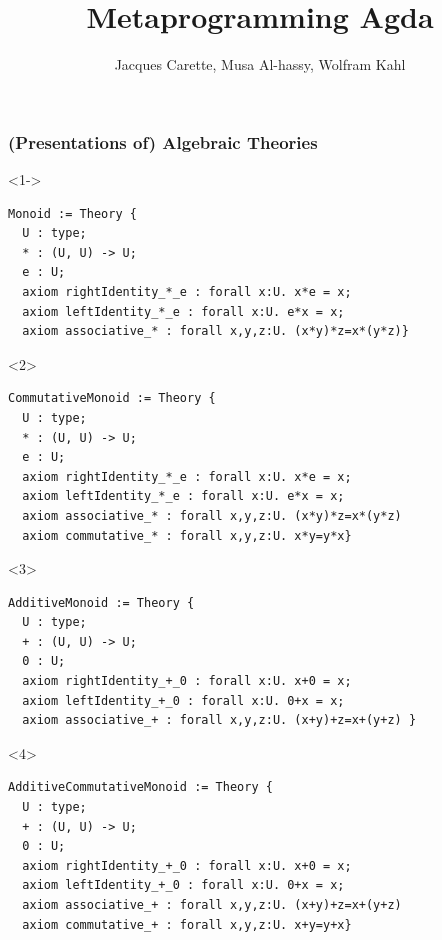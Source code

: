 \documentclass{beamer}
\title[Deriving]{Metaprogramming Agda}
\author[Carette, Al-hassy, Kahl]
  {\Large Jacques Carette, Musa Al-hassy, Wolfram Kahl}
\institute[McMaster]{McMaster University}
\begin{document}
\begin{frame}
\thispagestyle{empty}
\titlepage
\end{frame}


\begin{frame}[t,fragile]
\frametitle{(Presentations of) Algebraic Theories}
\lstset{language=mathscheme,basicstyle=\small}
\begin{onlyenv}<1->
\begin{lstlisting}
Monoid := Theory { 
  U : type;
  * : (U, U) -> U;
  e : U;
  axiom rightIdentity_*_e : forall x:U. x*e = x;
  axiom leftIdentity_*_e : forall x:U. e*x = x;
  axiom associative_* : forall x,y,z:U. (x*y)*z=x*(y*z)}
\end{lstlisting}
\end{onlyenv}
\begin{onlyenv}<2>
\begin{lstlisting}
CommutativeMonoid := Theory { 
  U : type;
  * : (U, U) -> U;
  e : U;
  axiom rightIdentity_*_e : forall x:U. x*e = x;
  axiom leftIdentity_*_e : forall x:U. e*x = x;
  axiom associative_* : forall x,y,z:U. (x*y)*z=x*(y*z)
  axiom commutative_* : forall x,y,z:U. x*y=y*x}
\end{lstlisting}
\end{onlyenv}
\begin{onlyenv}<3>
\begin{lstlisting}
AdditiveMonoid := Theory { 
  U : type;
  + : (U, U) -> U;
  0 : U;
  axiom rightIdentity_+_0 : forall x:U. x+0 = x;
  axiom leftIdentity_+_0 : forall x:U. 0+x = x;
  axiom associative_+ : forall x,y,z:U. (x+y)+z=x+(y+z) }
\end{lstlisting}
\end{onlyenv}
\begin{onlyenv}<4>
\begin{lstlisting}
AdditiveCommutativeMonoid := Theory { 
  U : type;
  + : (U, U) -> U;
  0 : U;
  axiom rightIdentity_+_0 : forall x:U. x+0 = x;
  axiom leftIdentity_+_0 : forall x:U. 0+x = x;
  axiom associative_+ : forall x,y,z:U. (x+y)+z=x+(y+z)
  axiom commutative_+ : forall x,y,z:U. x+y=y+x}
\end{lstlisting}
\end{onlyenv}
\end{frame}
\end{document}
